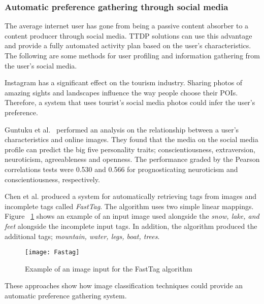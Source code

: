 \subsubsection{Automatic preference gathering through social media}

The average internet user has gone from being a
passive content absorber to a content producer through
social media. TTDP solutions can use this advantage
and provide a fully automated activity plan based on
the user's characteristics. The following are some
methods for user profiling and information gathering
from the user's social media. 


Instagram has a significant effect on the tourism
industry. Sharing photos of amazing sights and
landscapes influence the way people choose their
POIs\cite{Terttunen2017}. Therefore, a system that
uses tourist's social media photos could infer the
user's preference.

Guntuku et al.~\cite{Guntuku2017} performed an
analysis on the relationship between a user's
characteristics and online images. They found that the
media on the social media profile can predict the big
five personality traits; conscientiousness,
extraversion, neuroticism, agreeableness and openness.
The performance graded by the Pearson correlations
tests were 0.530 and 0.566 for prognosticating
neuroticism and conscientiousness, respectively.

Chen et al.\cite{Chen2013} produced a system for
automatically retrieving tags from images and
incomplete tags called \emph{FastTag}. The algorithm
uses two simple linear mappings. Figure ~\ref{fasttag}
shows an example of an input image used alongside the
\emph{snow, lake, and feet} alongside the incomplete
input tags. In addition, the algorithm produced the
additional tags; \emph{mountain, water, legs, boat,
trees}. 


\begin{figure}[h]
\centering
\texttt{[image: Fastag]}
\caption{Example of an image input for the FastTag algorithm}
\label{fasttag}
\end{figure}

These approaches show how image classification
techniques could provide an automatic preference
gathering system.
